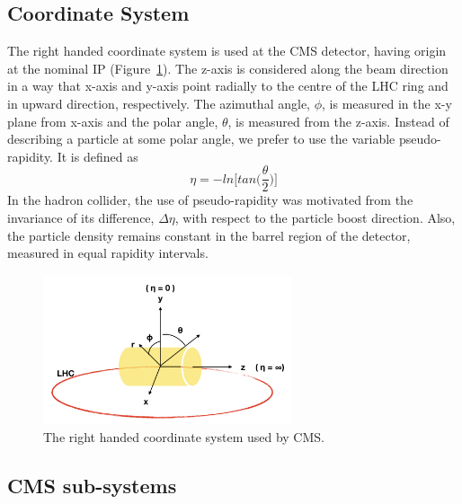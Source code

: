 {{{\subsection{Coordinate System} %
\label{sub:coordinate_system}
The right handed coordinate system is used at the CMS detector, having origin at the nominal IP (Figure~\ref{fig:cms-coordinate-system}). The z-axis is considered along the beam direction in a way that x-axis and y-axis point radially to the centre of the LHC ring and in upward direction, respectively. The azimuthal angle, $\phi$, is measured in the x-y plane from x-axis and the polar angle, $\theta$, is measured from the z-axis. Instead of describing a particle at some polar angle, we prefer to use the variable pseudo-rapidity. It is defined as 
\begin{equation}
	\eta = -ln\bigg[tan\Big(\frac{\theta}{2}\Big)\bigg]
\end{equation}
In the hadron collider, the use of pseudo-rapidity was motivated from the invariance of its difference, $\Delta \eta$, with respect to the particle boost direction. Also, the particle density remains constant in the barrel region of the detector, measured in equal rapidity intervals.

\begin{figure}[!htbp]
	\centering
	\includegraphics[width=0.65\textwidth]{figures/LHC/CMS-coordinate-system.png}
	\caption{The right handed coordinate system used by CMS.}
	\label{fig:cms-coordinate-system}
\end{figure}

\subsection{CMS sub-systems} %
\label{sub:cms_sub_systems}

}}}
